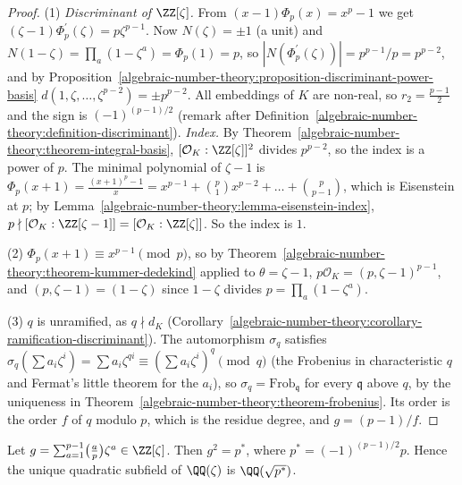 \begin{proof}
(1) \emph{Discriminant of $\ZZ[\zeta]$.} From $(x - 1)\Phi_p(x) = x^p - 1$ we get $(\zeta - 1)\Phi_p^{\prime}(\zeta) = p\zeta^{p-1}$. Now $N(\zeta) = \pm1$ (a unit) and $N(1 - \zeta) = \prod_a(1 - \zeta^a) = \Phi_p(1) = p$,
so $|N(\Phi_p^{\prime}(\zeta))| = p^{p-1}/p = p^{p-2}$, and by Proposition~\ref{algebraic-number-theory:proposition-discriminant-power-basis} $d(1, \zeta, \dots, \zeta^{p-2}) = \pm p^{p-2}$. All embeddings of
$K$ are non-real, so $r_2 = \frac{p-1}{2}$ and the sign is $(-1)^{(p-1)/2}$ (remark after Definition~\ref{algebraic-number-theory:definition-discriminant}). \emph{Index.} By Theorem~\ref{algebraic-number-theory:theorem-integral-basis}, $[\mathcal{O}_K : \ZZ[\zeta]]^2$ divides $p^{p-2}$, so the index is a power of $p$. The minimal polynomial of
$\zeta - 1$ is $\Phi_p(x + 1) = \frac{(x + 1)^p - 1}{x} = x^{p-1} + \binom p1x^{p-2} + \dots + \binom{p}{p-1}$, which is Eisenstein at $p$; by Lemma~\ref{algebraic-number-theory:lemma-eisenstein-index},
$p \nmid [\mathcal{O}_K : \ZZ[\zeta - 1]] = [\mathcal{O}_K : \ZZ[\zeta]]$. So the index is $1$.

(2) $\Phi_p(x + 1) \equiv x^{p-1} \pmod p$, so by Theorem~\ref{algebraic-number-theory:theorem-kummer-dedekind} applied to $\theta = \zeta - 1$, $p\mathcal{O}_K = (p, \zeta - 1)^{p-1}$, and
$(p, \zeta - 1) = (1 - \zeta)$ since $1 - \zeta$ divides $p = \prod_a(1 - \zeta^a)$.

(3) $q$ is unramified, as $q \nmid d_K$ (Corollary~\ref{algebraic-number-theory:corollary-ramification-discriminant}). The automorphism $\sigma_q$ satisfies
$\sigma_q(\sum a_i\zeta^i) = \sum a_i\zeta^{qi} \equiv (\sum a_i\zeta^i)^q \pmod q$ (the Frobenius in characteristic $q$ and Fermat's little theorem for the $a_i$), so $\sigma_q = \mathrm{Frob}_\mathfrak{q}$ for every
$\mathfrak{q}$ above $q$, by the uniqueness in Theorem~\ref{algebraic-number-theory:theorem-frobenius}. Its order is the order $f$ of $q$ modulo $p$, which is the residue degree, and $g = (p - 1)/f$.
\end{proof}

\begin{proposition}\label{algebraic-number-theory:proposition-gauss-sum}
Let $g = \sum_{a=1}^{p-1}\bigl(\frac ap\bigr)\zeta^a \in \ZZ[\zeta]$. Then $g^2 = p^*$, where $p^* = (-1)^{(p-1)/2}p$. Hence the unique quadratic subfield of $\QQ(\zeta)$ is $\QQ(\sqrt{p^*})$.
\end{proposition}

